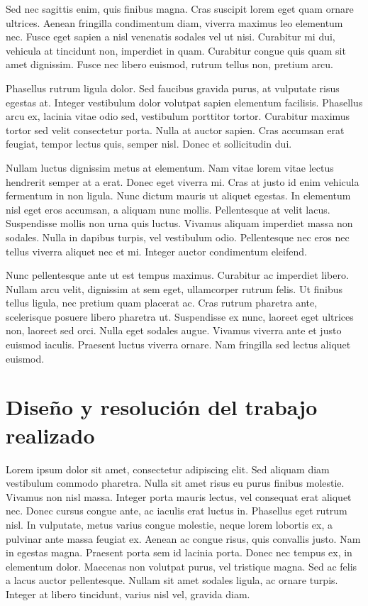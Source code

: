 Sed nec sagittis enim, quis finibus magna. Cras suscipit lorem eget quam ornare ultrices. Aenean fringilla condimentum diam, viverra maximus leo elementum nec. Fusce eget sapien a nisl venenatis sodales vel ut nisi. Curabitur mi dui, vehicula at tincidunt non, imperdiet in quam. Curabitur congue quis quam sit amet dignissim. Fusce nec libero euismod, rutrum tellus non, pretium arcu.

Phasellus rutrum ligula dolor. Sed faucibus gravida purus, at vulputate risus egestas at. Integer vestibulum dolor volutpat sapien elementum facilisis. Phasellus arcu ex, lacinia vitae odio sed, vestibulum porttitor tortor. Curabitur maximus tortor sed velit consectetur porta. Nulla at auctor sapien. Cras accumsan erat feugiat, tempor lectus quis, semper nisl. Donec et sollicitudin dui.

Nullam luctus dignissim metus at elementum. Nam vitae lorem vitae lectus hendrerit semper at a erat. Donec eget viverra mi. Cras at justo id enim vehicula fermentum in non ligula. Nunc dictum mauris ut aliquet egestas. In elementum nisl eget eros accumsan, a aliquam nunc mollis. Pellentesque at velit lacus. Suspendisse mollis non urna quis luctus. Vivamus aliquam imperdiet massa non sodales. Nulla in dapibus turpis, vel vestibulum odio. Pellentesque nec eros nec tellus viverra aliquet nec et mi. Integer auctor condimentum eleifend.

Nunc pellentesque ante ut est tempus maximus. Curabitur ac imperdiet libero. Nullam arcu velit, dignissim at sem eget, ullamcorper rutrum felis. Ut finibus tellus ligula, nec pretium quam placerat ac. Cras rutrum pharetra ante, scelerisque posuere libero pharetra ut. Suspendisse ex nunc, laoreet eget ultrices non, laoreet sed orci. Nulla eget sodales augue. Vivamus viverra ante et justo euismod iaculis. Praesent luctus viverra ornare. Nam fringilla sed lectus aliquet euismod.




\chapter{Diseño y resolución del trabajo realizado}

Lorem ipsum dolor sit amet, consectetur adipiscing elit. Sed aliquam diam vestibulum commodo pharetra. Nulla sit amet risus eu purus finibus molestie. Vivamus non nisl massa. Integer porta mauris lectus, vel consequat erat aliquet nec. Donec cursus congue ante, ac iaculis erat luctus in. Phasellus eget rutrum nisl. In vulputate, metus varius congue molestie, neque lorem lobortis ex, a pulvinar ante massa feugiat ex. Aenean ac congue risus, quis convallis justo. Nam in egestas magna. Praesent porta sem id lacinia porta. Donec nec tempus ex, in elementum dolor. Maecenas non volutpat purus, vel tristique magna. Sed ac felis a lacus auctor pellentesque. Nullam sit amet sodales ligula, ac ornare turpis. Integer at libero tincidunt, varius nisl vel, gravida diam.

